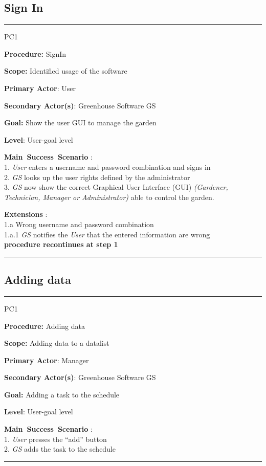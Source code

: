 \subsection{Sign In}
\vspace{0.5cm}
\hrule
\hfill \break
\begin{lyxlist}{PC1}
\small{
\item [\textbf{Procedure:}] SignIn
\item [\textbf{Scope:}] Identified usage of the software
\item [\textbf{Primary Actor}:] User
\item [\textbf{Secondary Actor(s)}:] Greenhouse Software GS
\item [\textbf{Goal:}] Show the user GUI to manage the garden
\item [\textbf{Level}:] User-goal level
\item [\textbf{Main~Success~Scenario}]:\\
1. \emph{User} enters a username and password combination and signs in\\
2. \emph{GS} looks up the user rights defined by the administrator\\
3. \emph{GS} now show the correct Graphical User Interface (GUI) \emph{(Gardener, Technician, Manager or Administrator)} able to control the garden.
\item [\textbf{Extensions}]:\\
1.a Wrong username and password combination\\
\hspace*{0.5cm} 1.a.1 \emph{GS} notifies the \emph{User} that the entered information are wrong\\
\hspace*{0.5cm} \textbf{procedure recontinues at step 1}
}
\end{lyxlist}
\hrule
\vspace{0.5cm}



\subsection{Adding data}
\vspace{0.5cm}
\hfill \break
\hrule
\begin{lyxlist}{PC1}
\small{
\item [\textbf{Procedure:}] Adding data
\item [\textbf{Scope:}] Adding data to a datalist
\item [\textbf{Primary Actor}:] Manager
\item [\textbf{Secondary Actor(s)}:] Greenhouse Software GS
\item [\textbf{Goal:}] Adding a task to the schedule
\item [\textbf{Level}:] User-goal level
\item [\textbf{Main~Success~Scenario}]:\\
1. \emph{User} presses the “add” button\\
2. \emph{GS} adds the task to the schedule\\
}
\end{lyxlist}
\hrule
\vspace{0.5cm}





